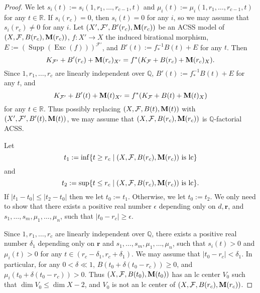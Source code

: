 \documentclass[11pt]{amsart}
\numberwithin{equation}{section}
\newcommand{\Mm}{{\bf{M}}}
\newcommand{\Qq}{\mathbb{Q}}
\newcommand{\Exc}{\operatorname{Exc}}
\newcommand{\Supp}{\operatorname{Supp}}
\newcommand{\Ff}{\mathcal{F}}
\theoremstyle{definition}
\theoremstyle{definition}
\theoremstyle{definition}
\begin{document}
\begin{proof}
We let $s_i(t):=s_i(1,r_1,\dots,r_{c-1},t)$ and $\mu_i(t):=\mu_i(1,r_1,\dots,r_{c-1},t)$ for any $t\in\mathbb R$. If $s_i(r_c)=0$, then $s_i(t)=0$ for any $i$, so we may assume that $s_i(r_c)\not=0$ for any $i$. Let $(X',\Ff',B'(r_c),\Mm(r_c))$ be an ACSS model of $(X,\Ff,B(r_c),\Mm(r_c))$, $f: X'\rightarrow X$ the induced birational morphism, $E:=(\Supp(\Exc(f)))^{\Ff'}$, and $B'(t):=f^{-1}_*B(t)+E$ for any $t$. Then
$$K_{\Ff'}+B'(r_c)+\Mm(r_c)_{X'}=f^*(K_{\Ff}+B(r_c)+\Mm(r_c)_{X}).$$
Since $1,r_1,\dots,r_c$ are linearly independent over $\mathbb Q$, 
$B'(t):=f^{-1}_*B(t)+E$ for any $t$, and
$$K_{\Ff'}+B'(t)+\Mm(t)_{X'}=f^*(K_{\Ff}+B(t)+\Mm(t)_{X})$$
for any $t\in\mathbb R$. Thus possibly replacing $(X,\Ff,B(t),\Mm(t))$ with $(X',\Ff',B'(t),\Mm(t))$, we may assume that $(X,\Ff,B(r_c),\Mm(r_c))$ is $\Qq$-factorial ACSS.

Let $$t_1:=\inf\{t\geq r_c\mid (X,\Ff,B(r_c),\Mm(r_c))\text{ is lc}\}$$
and 
$$t_2:=\sup\{t\leq r_c\mid (X,\Ff,B(r_c),\Mm(r_c))\text{ is lc}\}.$$
If $|t_1-t_0|\leq |t_2-t_0|$ then we let $t_0:=t_1$. Otherwise, we let $t_0:=t_2$. We only need to show that there exists a positive real number $\epsilon$ depending only on $d,\bm{r}$, and $s_1,\dots,s_m,\mu_1,\dots,\mu_n$, such that $|t_0-r_c|\geq\epsilon$. 

Since $1,r_1,\dots,r_c$ are linearly independent over $\mathbb Q$, there exists a positive real number $\delta_1$ depending only on $\bm{r}$ and $s_1,\dots,s_m,\mu_1,\dots,\mu_n$, such that $s_i(t)>0$ and $\mu_i(t)>0$ for any $t\in (r_c-\delta_1,r_c+\delta_1)$. We may assume that $|t_0-r_c|<\delta_1$. In particular, for any $0<\delta\ll 1$, $B(t_0+\delta(t_0-r_c))\geq 0$, and $\mu_i(t_0+\delta(t_0-r_c))>0$. Thus $(X,\Ff,B(t_0),\Mm(t_0))$ has an lc center $V_0$ such that $\dim V_0\leq \dim X-2$, and $V_0$ is not an lc center of $(X,\Ff,B(r_c),\Mm(r_c))$. 


\end{proof}
\end{document}
